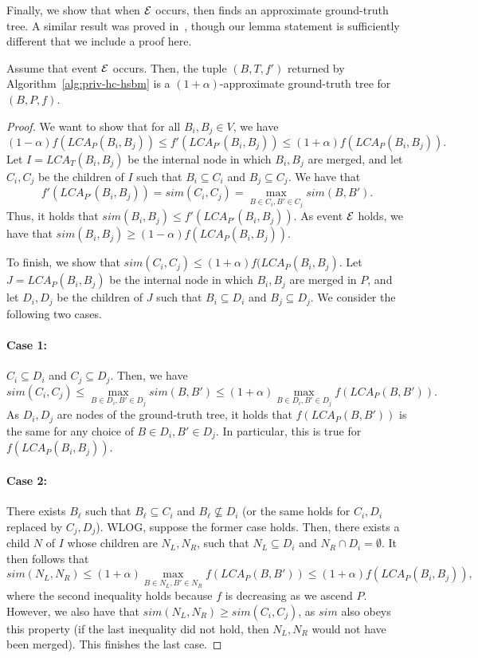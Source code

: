 Finally, we show that when $\mathcal{E}$ occurs, then \dphcblocks{} finds an approximate ground-truth tree. A similar result was proved in~\citet{cohen2019hierarchical}, though our lemma statement is sufficiently different that we include a proof here.
\begin{lem}\label{lem:approx-ground-truth}
Assume that event $\mathcal{E}$ occurs. Then, the tuple $(B, T, f')$ returned by Algorithm~\ref{alg:priv-hc-hsbm} is a $(1 + \alpha)$-approximate ground-truth tree for $(B, P, f)$.
\end{lem}
\begin{proof}
We want to show that for all $B_i, B_j \in V$, we have
\[
    (1-\alpha) f(LCA_P(B_i, B_j)) \leq f'(LCA_{P'}(B_i,B_j)) \leq (1+\alpha) f(LCA_P(B_i, B_j)).
\]
Let $I = LCA_{T}(B_i, B_j)$ be the internal node in which $B_i, B_j$ are merged, and let $C_i, C_j$ be the children of $I$ such that $B_i \subseteq C_i$ and $B_j \subseteq C_j$.
We have that
\[
    f'(LCA_{P'}(B_i, B_j)) = sim(C_i, C_j) = \max_{B \in C_i, B' \in C_j} sim (B, B').
\]
Thus, it holds that $sim(B_i, B_j) \leq f'(LCA_{P'}(B_i, B_j))$. As event $\mathcal{E}$ holds, we have that $sim(B_i, B_j) \geq (1-\alpha)f(LCA_P(B_i, B_j))$.

To finish, we show that $sim(C_i, C_j) \leq (1+\alpha) f(LCA_P(B_i, B_j)$.
Let $J = LCA_P(B_i, B_j)$ be the internal node in which $B_i, B_j$ are merged in $P$, and let $D_i, D_j$ be the children of $J$ such that $B_i \subseteq D_i$ and $B_j \subseteq D_j$. We consider the following two cases.
\paragraph{Case 1:} $C_i \subseteq D_i$ and $C_j \subseteq D_j$.
Then, we have 
\[
    sim(C_i, C_j) \leq \max_{B \in D_i, B' \in D_j} sim(B, B') \leq (1+\alpha) \max_{B \in D_i, B' \in D_j} f(LCA_P(B, B')).
\]
As $D_i, D_j$ are nodes of the ground-truth tree, it holds that $f(LCA_P(B, B'))$ is the same for any choice of $B \in D_i, B' \in D_j$. In particular, this is true for $f(LCA_P(B_i, B_j))$.

\paragraph{Case 2:} There exists $B_\ell$ such that $B_\ell \subseteq C_i$ and $B_\ell \nsubseteq D_i$ (or the same holds for $C_i, D_i$ replaced by $C_j, D_j$).
WLOG, suppose the former case holds. Then, there exists a child $N$ of $I$ whose children are $N_L, N_R$, such that $N_L \subseteq D_i$ and $N_R \cap D_i = \emptyset$. It then follows that 
\[
    sim(N_L, N_R) \leq (1+\alpha) \max_{B \in N_L, B' \in N_R} f(LCA_P(B, B')) \leq (1+\alpha) f(LCA_P(B_i, B_j)),
\]
where the second inequality holds because $f$ is decreasing as we ascend $P$.
However, we also have that $sim(N_L, N_R) \geq sim(C_i, C_j)$, as $sim$ also obeys this property (if the last inequality did not hold, then $N_L, N_R$ would not have been merged). This finishes the last case.
\end{proof}

